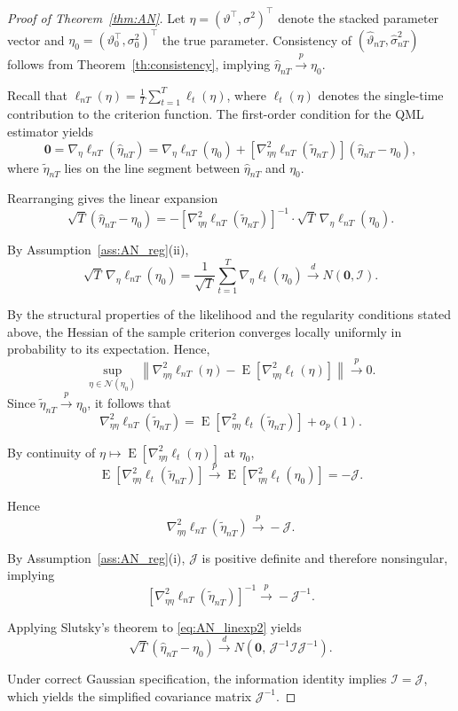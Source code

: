 \documentclass[12pt]{article}
\theoremstyle{plain}
\theoremstyle{definition}
\newcommand{\xvec}{\boldsymbol}
\DeclareMathOperator{\E}{E}
\begin{document}
\begin{proof}[Proof of Theorem~\ref{thm:AN}]
Let $\eta=(\vartheta^\top,\sigma^2)^\top$ denote the stacked parameter
vector and $\eta_0=(\vartheta_0^\top,\sigma_0^2)^\top$ the true parameter.
Consistency of $(\hat\vartheta_{nT},\hat\sigma^2_{nT})$ follows from
Theorem~\ref{th:consistency}, implying $\hat\eta_{nT}\xrightarrow{p}\eta_0$.

Recall that $\ell_{nT}(\eta)=\frac{1}{T}\sum_{t=1}^T\ell_t(\eta)$,
where $\ell_t(\eta)$ denotes the single-time contribution to the
criterion function. The first-order condition for the QML estimator yields
\[
\xvec{0}
=
\nabla_\eta \ell_{nT}(\hat\eta_{nT})
=
\nabla_\eta \ell_{nT}(\eta_0)
+
\left[\nabla^2_{\eta\eta}\ell_{nT}(\tilde\eta_{nT})\right]
(\hat\eta_{nT}-\eta_0),
\]
where $\tilde\eta_{nT}$ lies on the line segment between
$\hat\eta_{nT}$ and $\eta_0$.

Rearranging gives the linear expansion
\begin{equation}\label{eq:AN_linexp2}
\sqrt{T}(\hat\eta_{nT}-\eta_0)
=
-\left[\nabla^2_{\eta\eta}\ell_{nT}(\tilde\eta_{nT})\right]^{-1}
\cdot
\sqrt{T}\,\nabla_\eta\ell_{nT}(\eta_0).
\end{equation}

By Assumption~\ref{ass:AN_reg}(ii),
\[
\sqrt{T}\,\nabla_\eta\ell_{nT}(\eta_0)
=
\frac{1}{\sqrt{T}}\sum_{t=1}^T\nabla_\eta\ell_t(\eta_0)
\xrightarrow{d}N(\xvec{0},\mathcal{I}).
\]

By the structural properties of the likelihood and the regularity
conditions stated above, the Hessian of the sample criterion converges
locally uniformly in probability to its expectation. Hence,
\[
\sup_{\eta\in\mathcal{N}(\eta_0)}
\left\|
\nabla^2_{\eta\eta}\ell_{nT}(\eta)
-
\E[\nabla^2_{\eta\eta}\ell_t(\eta)]
\right\|
\xrightarrow{p}0.
\]
Since $\tilde\eta_{nT}\xrightarrow{p}\eta_0$,
it follows that
\[
\nabla^2_{\eta\eta}\ell_{nT}(\tilde\eta_{nT})
=
\E[\nabla^2_{\eta\eta}\ell_t(\tilde\eta_{nT})]
+o_p(1).
\]

By continuity of
$\eta\mapsto\E[\nabla^2_{\eta\eta}\ell_t(\eta)]$ at $\eta_0$,
\[
\E[\nabla^2_{\eta\eta}\ell_t(\tilde\eta_{nT})]
\xrightarrow{p}
\E[\nabla^2_{\eta\eta}\ell_t(\eta_0)]
=
-\mathcal{J}.
\]

Hence
\[
\nabla^2_{\eta\eta}\ell_{nT}(\tilde\eta_{nT})
\xrightarrow{p}-\mathcal{J}.
\]

By Assumption~\ref{ass:AN_reg}(i),
$\mathcal{J}$ is positive definite and therefore nonsingular, implying
\[
\left[\nabla^2_{\eta\eta}\ell_{nT}(\tilde\eta_{nT})\right]^{-1}
\xrightarrow{p}
-\mathcal{J}^{-1}.
\]

Applying Slutsky's theorem to \eqref{eq:AN_linexp2} yields
\[
\sqrt{T}(\hat\eta_{nT}-\eta_0)
\xrightarrow{d}
N\!\left(\xvec{0},\,\mathcal{J}^{-1}\mathcal{I}\mathcal{J}^{-1}\right).
\]

Under correct Gaussian specification,
the information identity implies $\mathcal{I}=\mathcal{J}$,
which yields the simplified covariance matrix $\mathcal{J}^{-1}$.
\end{proof}
\end{document}
